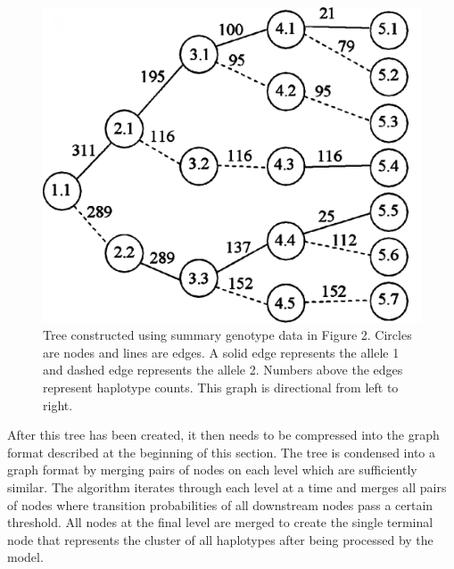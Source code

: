 \documentclass[a4paper,11pt,twoside,abstraction,titlepage]{article}
\begin{document}
\begin{figure}[htp!]
\vspace{10pt}
\begin{center}
\centerline{\includegraphics[scale=0.08]{fig3}}
\vspace{2pt}
\caption{Tree constructed using summary genotype data in Figure 2. Circles are nodes and lines are edges. A solid edge represents the allele 1 and dashed edge represents the allele 2. Numbers above the edges represent haplotype counts.  This graph is directional from left to right. \cite{beagle1}}

\end{center}
\vspace{-25pt}
\end{figure}


After this tree has been created, it then needs to be compressed into the graph format described at the beginning of this section.  The tree is condensed into a graph format by merging pairs of nodes on each level which are sufficiently similar.  The algorithm iterates through each level at a time and merges all pairs of nodes where transition probabilities of all downstream nodes pass a certain threshold.  All nodes at the final level are merged to create the single terminal node that represents the cluster of all haplotypes after being processed by the model.
\end{document}
